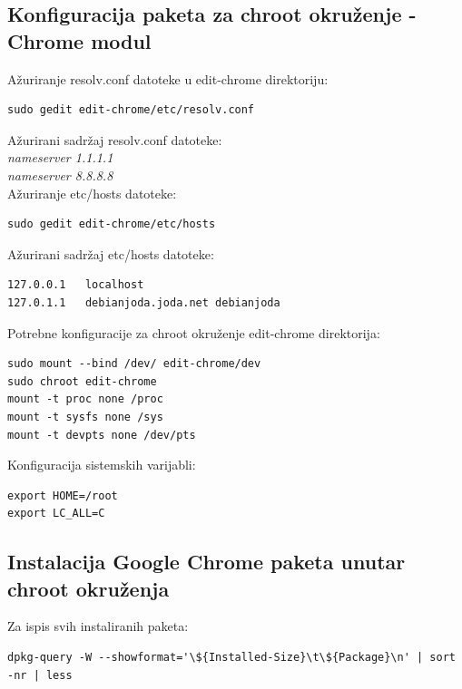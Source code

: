 \documentclass[12pt,vi]{mitthesis}
\begin{document}
\subsection*{Konfiguracija paketa za chroot okruženje - Chrome modul}
\indent
Ažuriranje resolv.conf datoteke u edit-chrome direktoriju:
\begin{lstlisting}[style=BashInputStyle]
sudo gedit edit-chrome/etc/resolv.conf
\end{lstlisting}
Ažurirani sadržaj resolv.conf datoteke:\\
\textit{nameserver 1.1.1.1 \\
nameserver 8.8.8.8}\\
\noindent
Ažuriranje etc/hosts datoteke:
\begin{lstlisting}[style=BashInputStyle]
sudo gedit edit-chrome/etc/hosts
\end{lstlisting}
Ažurirani sadržaj etc/hosts datoteke:
\begin{lstlisting}
127.0.0.1	localhost
127.0.1.1	debianjoda.joda.net	debianjoda
\end{lstlisting}

\noindent
Potrebne konfiguracije za chroot okruženje edit-chrome direktorija:
\begin{lstlisting}[style=BashInputStyle]
sudo mount --bind /dev/ edit-chrome/dev
sudo chroot edit-chrome
mount -t proc none /proc
mount -t sysfs none /sys
mount -t devpts none /dev/pts
\end{lstlisting}
\noindent
Konfiguracija sistemskih varijabli:
\begin{lstlisting}[style=BashInputStyle]
export HOME=/root
export LC_ALL=C
\end{lstlisting}

\subsection*{Instalacija Google Chrome paketa unutar chroot okruženja}
\noindent
Za ispis svih instaliranih paketa:
\begin{lstlisting}[style=BashInputStyle]
dpkg-query -W --showformat='\${Installed-Size}\t\${Package}\n' | sort -nr | less
\end{lstlisting}
\end{document}
